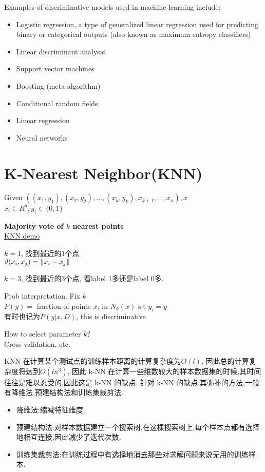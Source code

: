 \documentclass{article}
\begin{document}
Examples of discriminative models used in machine learning include:
\begin{itemize}
\item Logistic regression, a type of generalized linear regression used for predicting binary or categorical outputs (also known as maximum entropy classifiers)
\item Linear discriminant analysis
\item Support vector machines
\item Boosting (meta-algorithm)
\item Conditional random fields
\item Linear regression
\item Neural networks
\end{itemize}

\section{K-Nearest Neighbor(KNN)}
Given $((x_1, y_1), (x_2, y_2), \ldots, (x_k, y_k), x_{k+1}, \ldots, x_n), x$\\
$x_i \in R^d, y_i \in \{0, 1\}$

\textbf{Majority vote of $k$ nearest points}\\
\href{http://upload.wikimedia.org/wikipedia/commons/thumb/e/e7/KnnClassification.svg/220px-KnnClassification.svg.png}{KNN demo}

$k=1$, 找到最近的1个点\\
$d(x_i, x_j) = \left\Vert x_i - x_j\right\Vert$

$k=3$, 找到最近的3个点, 看label 1多还是label 0多.

Prob interpretation. Fix $k$\\
$P(y) =$ fraction of points $x_i$ in $N_k(x)$ s.t $y_i = y$\\
有时也记为$P(y|x, D)$, this is discriminative

How to select parameter $k$?\\
Cross validation, etc.

KNN 在计算某个测试点的训练样本距离的计算复杂度为$O(l)$, 因此总的计算复杂度将达到$O(ln^3)$,
因此 k-NN 在计算一些维数较大的样本数据集的时候,其时间往往是难以忍受的,因此这是 k-NN 的缺点.
针对 k-NN 的缺点,其弥补的方法,一般有降维法,预建结构法和训练集裁剪法.
\begin{itemize}
\item 降维法:缩减特征维度.
\item 预建结构法:对样本数据建立一个搜索树,在这棵搜索树上,每个样本点都有选择地相互连接,因此减少了迭代次数.
\item 训练集裁剪法:在训练过程中有选择地消去那些对求解问题来说无用的训练样本.
\end{itemize}
\end{document}
